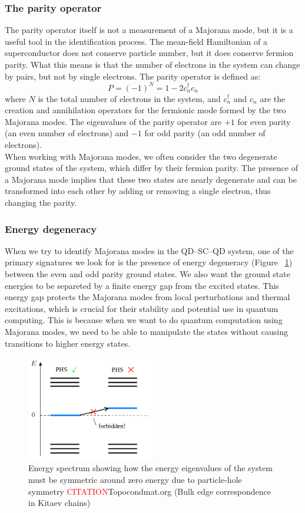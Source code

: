 \documentclass[11pt, letterpaper, titlepage]{article}
\begin{document}
\subsubsection{The parity operator}
The parity operator itself is not a measurement of a Majorana mode, but it is a useful tool in the identification process. The mean-field Hamiltonian of a superconductor does not conserve particle number, but it does conserve fermion parity. What this means is that the number of electrons in the system can change by pairs, but not by single electrons. The parity operator is defined as:
$$
P = (-1)^{N} = 1 - 2c_n ^{†} c_n
$$
where $N$ is the total number of electrons in the system, and $c_n^{†}$ and $c_n$ are the creation and annihilation operators for the fermionic mode formed by the two Majorana modes. The eigenvalues of the parity operator are $+1$ for even parity (an even number of electrons) and $-1$ for odd parity (an odd number of electrons).\\
When working with Majorana modes, we often consider the two degenerate ground states of the system, which differ by their fermion parity. The presence of a Majorana mode implies that these two states are nearly degenerate and can be transformed into each other by adding or removing a single electron, thus changing the parity.\\

\subsubsection{Energy degeneracy}
When we try to identify Majorana modes in the QD–SC–QD system, one of the primary signatures we look for is the presence of energy degeneracy (Figure ~\ref{fig:gs_symmetry}) between the even and odd parity ground states. We also want the ground state energies to be separeted by a finite energy gap from the excited states. This energy gap protects the Majorana modes from local perturbations and thermal excitations, which is crucial for their stability and potential use in quantum computing. This is because when we want to do quantum computation using Majorana modes, we need to be able to manipulate the states without causing transitions to higher energy states.\\
\begin{figure}
  \centering
  \includegraphics[width=0.5\textwidth]{../External_Figs/gs_symmetry.png}%
  \caption{Energy spectrum showing how the energy eigenvalues of the system must be symmetric around zero energy due to particle-hole symmetry \textcolor{red}{CITATION}Topocondmat.org (Bulk edge correspondence in Kitaev chains)}
  \label{fig:gs_symmetry}
\end{figure}
\newpage
\end{document}
